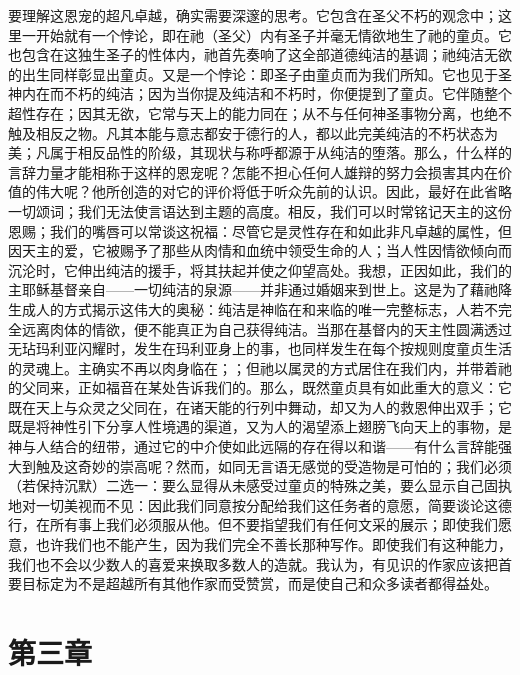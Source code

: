 要理解这恩宠的超凡卓越，确实需要深邃的思考。它包含在圣父不朽的观念中；这里一开始就有一个悖论，即在祂（圣父）内有圣子并毫无情欲地生了祂的童贞。它也包含在这独生圣子的性体内，祂首先奏响了这全部道德纯洁的基调；祂纯洁无欲的出生同样彰显出童贞。又是一个悖论：即圣子由童贞而为我们所知。它也见于圣神内在而不朽的纯洁；因为当你提及纯洁和不朽时，你便提到了童贞。它伴随整个超性存在；因其无欲，它常与天上的能力同在；从不与任何神圣事物分离，也绝不触及相反之物。凡其本能与意志都安于德行的人，都以此完美纯洁的不朽状态为美；凡属于相反品性的阶级，其现状与称呼都源于从纯洁的堕落。那么，什么样的言辞力量才能相称于这样的恩宠呢？怎能不担心任何人雄辩的努力会损害其内在价值的伟大呢？他所创造的对它的评价将低于听众先前的认识。因此，最好在此省略一切颂词；我们无法使言语达到主题的高度。相反，我们可以时常铭记天主的这份恩赐；我们的嘴唇可以常谈这祝福：尽管它是灵性存在和如此非凡卓越的属性，但因天主的爱，它被赐予了那些从肉情和血统中领受生命的人；当人性因情欲倾向而沉沦时，它伸出纯洁的援手，将其扶起并使之仰望高处。我想，正因如此，我们的主耶稣基督亲自——一切纯洁的泉源——并非通过婚姻来到世上。这是为了藉祂降生成人的方式揭示这伟大的奥秘：纯洁是神临在和来临的唯一完整标志，人若不完全远离肉体的情欲，便不能真正为自己获得纯洁。当那在基督内的天主性圆满透过无玷玛利亚闪耀时，发生在玛利亚身上的事，也同样发生在每个按规则度童贞生活的灵魂上。主确实不再以肉身临在；；但祂以属灵的方式居住在我们内，并带着祂的父同来，正如福音在某处告诉我们的。那么，既然童贞具有如此重大的意义：它既在天上与众灵之父同在，在诸天能的行列中舞动，却又为人的救恩伸出双手；它既是将神性引下分享人性境遇的渠道，又为人的渴望添上翅膀飞向天上的事物，是神与人结合的纽带，通过它的中介使如此远隔的存在得以和谐——有什么言辞能强大到触及这奇妙的崇高呢？然而，如同无言语无感觉的受造物是可怕的；我们必须（若保持沉默）二选一：要么显得从未感受过童贞的特殊之美，要么显示自己固执地对一切美视而不见：因此我们同意按分配给我们这任务者的意愿，简要谈论这德行，在所有事上我们必须服从他。但不要指望我们有任何文采的展示；即使我们愿意，也许我们也不能产生，因为我们完全不善长那种写作。即使我们有这种能力，我们也不会以少数人的喜爱来换取多数人的造就。我认为，有见识的作家应该把首要目标定为不是超越所有其他作家而受赞赏，而是使自己和众多读者都得益处。\par


\section{第三章}

